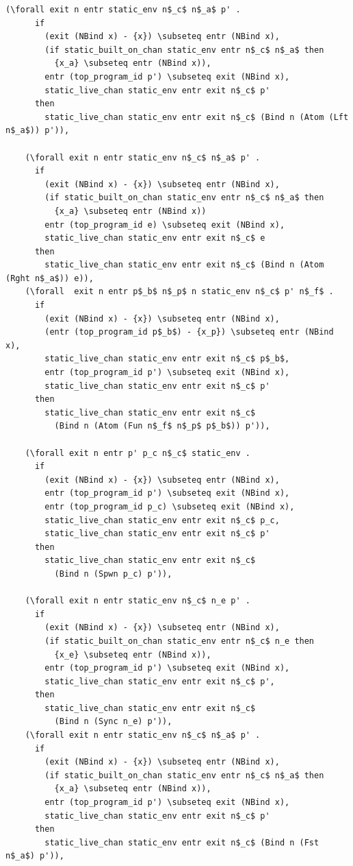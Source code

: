 \documentclass[10pt]{article}
\begin{document}
\begin{lstlisting}[language=logic, mathescape]
    (\forall exit n entr static_env n$_c$ n$_a$ p' . 
      if
        (exit (NBind x) - {x}) \subseteq entr (NBind x),
        (if static_built_on_chan static_env entr n$_c$ n$_a$ then
          {x_a} \subseteq entr (NBind x)),
        entr (top_program_id p') \subseteq exit (NBind x),
        static_live_chan static_env entr exit n$_c$ p'
      then
        static_live_chan static_env entr exit n$_c$ (Bind n (Atom (Lft n$_a$)) p')),

    (\forall exit n entr static_env n$_c$ n$_a$ p' . 
      if
        (exit (NBind x) - {x}) \subseteq entr (NBind x),
        (if static_built_on_chan static_env entr n$_c$ n$_a$ then
          {x_a} \subseteq entr (NBind x))
        entr (top_program_id e) \subseteq exit (NBind x),
        static_live_chan static_env entr exit n$_c$ e
      then
        static_live_chan static_env entr exit n$_c$ (Bind n (Atom (Rght n$_a$)) e)),
    (\forall  exit n entr p$_b$ n$_p$ n static_env n$_c$ p' n$_f$ . 
      if
        (exit (NBind x) - {x}) \subseteq entr (NBind x),
        (entr (top_program_id p$_b$) - {x_p}) \subseteq entr (NBind x),
        static_live_chan static_env entr exit n$_c$ p$_b$,
        entr (top_program_id p') \subseteq exit (NBind x),
        static_live_chan static_env entr exit n$_c$ p'
      then
        static_live_chan static_env entr exit n$_c$
          (Bind n (Atom (Fun n$_f$ n$_p$ p$_b$)) p')),

    (\forall exit n entr p' p_c n$_c$ static_env .
      if
        (exit (NBind x) - {x}) \subseteq entr (NBind x),
        entr (top_program_id p') \subseteq exit (NBind x),
        entr (top_program_id p_c) \subseteq exit (NBind x),
        static_live_chan static_env entr exit n$_c$ p_c,
        static_live_chan static_env entr exit n$_c$ p'
      then
        static_live_chan static_env entr exit n$_c$
          (Bind n (Spwn p_c) p')),

    (\forall exit n entr static_env n$_c$ n_e p' .
      if
        (exit (NBind x) - {x}) \subseteq entr (NBind x),
        (if static_built_on_chan static_env entr n$_c$ n_e then
          {x_e} \subseteq entr (NBind x)),
        entr (top_program_id p') \subseteq exit (NBind x),
        static_live_chan static_env entr exit n$_c$ p',
      then
        static_live_chan static_env entr exit n$_c$
          (Bind n (Sync n_e) p')),
    (\forall exit n entr static_env n$_c$ n$_a$ p' .
      if
        (exit (NBind x) - {x}) \subseteq entr (NBind x),
        (if static_built_on_chan static_env entr n$_c$ n$_a$ then
          {x_a} \subseteq entr (NBind x)),
        entr (top_program_id p') \subseteq exit (NBind x),
        static_live_chan static_env entr exit n$_c$ p'
      then
        static_live_chan static_env entr exit n$_c$ (Bind n (Fst n$_a$) p')),


\end{lstlisting}
\end{document}
